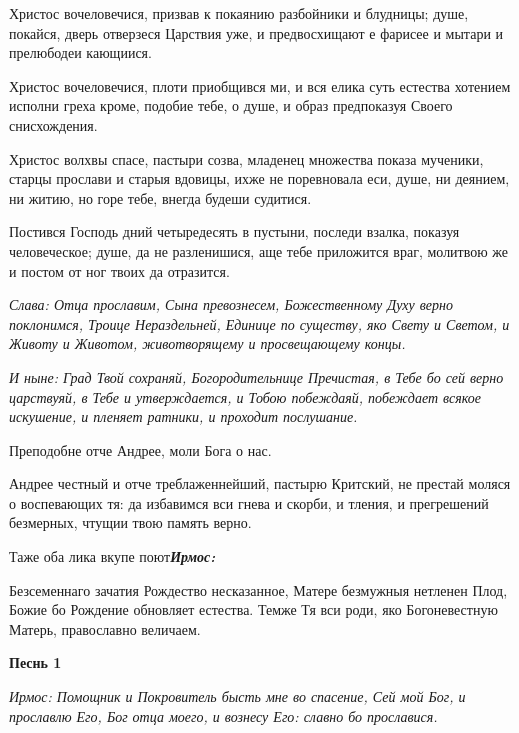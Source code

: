 Христос вочеловечися, призвав к покаянию разбойники и блудницы; душе, покайся, дверь отверзеся Царствия уже, и предвосхищают е фарисее и мытари и прелюбодеи кающиися. 

Христос вочеловечися, плоти приобщився ми, и вся елика суть естества хотением исполни греха кроме, подобие тебе, о душе, и образ предпоказуя Своего снисхождения. 

Христос волхвы спасе, пастыри созва, младенец множества показа мученики, старцы прослави и старыя вдовицы, ихже не поревновала еси, душе, ни деянием, ни житию, но горе тебе, внегда будеши судитися. 

Постився Господь дний четыредесять в пустыни, последи взалка, показуя человеческое; душе, да не разленишися, аще тебе приложится враг, молитвою же и постом от ног твоих да отразится. 

\itshape Слава\normalfont{}: Отца прославим, Сына превознесем, Божественному Духу верно поклонимся, Троице Нераздельней, Единице по существу, яко Свету и Светом, и Животу и Животом, животворящему и просвещающему концы. 

\itshape И ныне\normalfont{}: Град Твой сохраняй, Богородительнице Пречистая, в Тебе бо сей верно царствуяй, в Тебе и утверждается, и Тобою побеждаяй, побеждает всякое искушение, и пленяет ратники, и проходит послушание. 

\bfseries 

Преподобне отче Андрее, моли Бога о нас.

\normalfont{}

Андрее честный и отче треблаженнейший, пастырю Критский, не престай моляся о воспевающих тя: да избавимся вси гнева и скорби, и тления, и прегрешений безмерных, чтущии твою память верно. 

Таже оба лика вкупе поют\bfseries  \normalfont{}\itshape Ирмос: 

\normalfont{}Безсеменнаго зачатия Рождество несказанное, Матере безмужныя нетленен Плод, Божие бо Рождение обновляет естества. Темже Тя вси роди, яко Богоневестную Матерь, православно величаем. 

\bigskip\bigskip\mychapterending

 
\bfseries Песнь 1\normalfont{}

\itshape Ирмос\normalfont{}: Помощник и Покровитель бысть мне во спасение, Сей мой Бог, и прославлю Его, Бог отца моего, и вознесу Его: славно бо прославися. 

